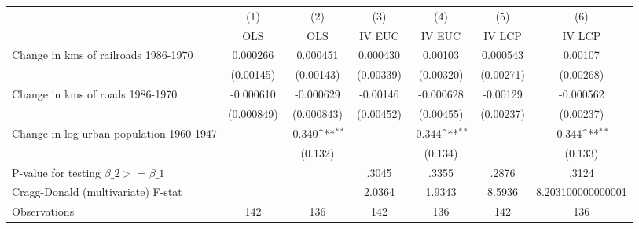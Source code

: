 {
\def\sym#1{\ifmmode^{#1}\else\(^{#1}\)\fi}
\begin{tabular}{l*{6}{c}}
\hline\hline
                &\multicolumn{1}{c}{(1)}&\multicolumn{1}{c}{(2)}&\multicolumn{1}{c}{(3)}&\multicolumn{1}{c}{(4)}&\multicolumn{1}{c}{(5)}&\multicolumn{1}{c}{(6)}\\
                &\multicolumn{1}{c}{OLS}&\multicolumn{1}{c}{OLS}&\multicolumn{1}{c}{IV EUC}&\multicolumn{1}{c}{IV EUC}&\multicolumn{1}{c}{IV LCP}&\multicolumn{1}{c}{IV LCP}\\
\hline
Change in kms of railroads 1986-1970& 0.000266         & 0.000451         & 0.000430         &  0.00103         & 0.000543         &  0.00107         \\
                &(0.00145)         &(0.00143)         &(0.00339)         &(0.00320)         &(0.00271)         &(0.00268)         \\
[1em]
Change in kms of roads 1986-1970&-0.000610         &-0.000629         & -0.00146         &-0.000628         & -0.00129         &-0.000562         \\
                &(0.000849)         &(0.000843)         &(0.00452)         &(0.00455)         &(0.00237)         &(0.00237)         \\
[1em]
Change in log urban population 1960-1947&                  &   -0.340\sym{**} &                  &   -0.344\sym{**} &                  &   -0.344\sym{**} \\
                &                  &  (0.132)         &                  &  (0.134)         &                  &  (0.133)         \\
\hline
P-value for testing $\beta\_{2} >= \beta\_{1}$&                  &                  &    .3045         &    .3355         &    .2876         &    .3124         \\
Cragg-Donald (multivariate) F-stat&                  &                  &   2.0364         &   1.9343         &   8.5936         &8.203100000000001         \\
Observations    &      142         &      136         &      142         &      136         &      142         &      136         \\
\hline\hline
\end{tabular}
}
